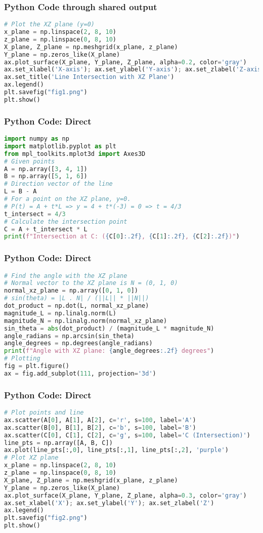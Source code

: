 \documentclass{beamer}
\begin{document}
\begin{frame}[fragile]
\frametitle{Python Code through shared output}
\begin{lstlisting}[language=Python]
# Plot the XZ plane (y=0)
x_plane = np.linspace(2, 8, 10)
z_plane = np.linspace(0, 8, 10)
X_plane, Z_plane = np.meshgrid(x_plane, z_plane)
Y_plane = np.zeros_like(X_plane)
ax.plot_surface(X_plane, Y_plane, Z_plane, alpha=0.2, color='gray')
ax.set_xlabel('X-axis'); ax.set_ylabel('Y-axis'); ax.set_zlabel('Z-axis')
ax.set_title('Line Intersection with XZ Plane')
ax.legend()
plt.savefig("fig1.png")
plt.show()
\end{lstlisting}
\end{frame}

\begin{frame}[fragile]
\frametitle{Python Code: Direct}
\begin{lstlisting}[language=Python]
import numpy as np
import matplotlib.pyplot as plt
from mpl_toolkits.mplot3d import Axes3D
# Given points
A = np.array([3, 4, 1])
B = np.array([5, 1, 6])
# Direction vector of the line
L = B - A
# For a point on the XZ plane, y=0.
# P(t) = A + t*L => y = 4 + t*(-3) = 0 => t = 4/3
t_intersect = 4/3
# Calculate the intersection point
C = A + t_intersect * L
print(f"Intersection at C: ({C[0]:.2f}, {C[1]:.2f}, {C[2]:.2f})")
\end{lstlisting}
\end{frame}
\begin{frame}[fragile]
\frametitle{Python Code: Direct}
\begin{lstlisting}[language=Python]
# Find the angle with the XZ plane
# Normal vector to the XZ plane is N = (0, 1, 0)
normal_xz_plane = np.array([0, 1, 0])
# sin(theta) = |L . N| / (||L|| * ||N||)
dot_product = np.dot(L, normal_xz_plane)
magnitude_L = np.linalg.norm(L)
magnitude_N = np.linalg.norm(normal_xz_plane)
sin_theta = abs(dot_product) / (magnitude_L * magnitude_N)
angle_radians = np.arcsin(sin_theta)
angle_degrees = np.degrees(angle_radians)
print(f"Angle with XZ plane: {angle_degrees:.2f} degrees")
# Plotting
fig = plt.figure()
ax = fig.add_subplot(111, projection='3d')
\end{lstlisting}
\end{frame}
\begin{frame}[fragile]
\frametitle{Python Code: Direct}
\begin{lstlisting}[language=Python]
# Plot points and line
ax.scatter(A[0], A[1], A[2], c='r', s=100, label='A')
ax.scatter(B[0], B[1], B[2], c='b', s=100, label='B')
ax.scatter(C[0], C[1], C[2], c='g', s=100, label='C (Intersection)')
line_pts = np.array([A, B, C])
ax.plot(line_pts[:,0], line_pts[:,1], line_pts[:,2], 'purple')
# Plot XZ plane
x_plane = np.linspace(2, 8, 10)
z_plane = np.linspace(0, 8, 10)
X_plane, Z_plane = np.meshgrid(x_plane, z_plane)
Y_plane = np.zeros_like(X_plane)
ax.plot_surface(X_plane, Y_plane, Z_plane, alpha=0.3, color='gray')
ax.set_xlabel('X'); ax.set_ylabel('Y'); ax.set_zlabel('Z')
ax.legend()
plt.savefig("fig2.png")
plt.show()
\end{lstlisting}
\end{frame}
\end{document}
